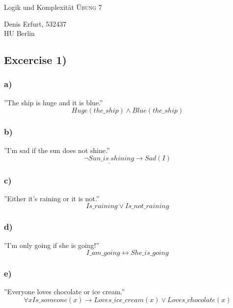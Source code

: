 \documentclass[12pt]{article}
\begin{document}
\begin{center}
\Large
Logik und Komplexität  \textsc{ Übung 7 }
\end{center}

\begin{flushright}
Denis Erfurt, 532437\\
HU Berlin \\

\vspace{2 mm}

\end{flushright}





\subsection*{Excercise 1)}
\subsubsection*{a)}
”The ship is huge and it is blue.”
\begin{equation}
  Huge(the\_ship) \land Blue(the\_ship)
\end{equation}
\subsubsection*{b)}
”I’m sad if the sun does not shine.”
\begin{equation}
  \neg Sun\_is_\_shining \rightarrow Sad(I)
\end{equation}
\subsubsection*{c)}
”Either it’s raining or it is not.”
\begin{equation}
  Is\_raining \lor Is\_not\_raining
\end{equation}
\subsubsection*{d)}
”I’m only going if she is going!”
\begin{equation}
  I\_am\_going \leftrightarrow She\_is\_going
\end{equation}
\subsubsection*{e)}
”Everyone loves chocolate or ice cream.”
\begin{equation}
  \forall x Is\_someone(x) \rightarrow  Loves\_ice\_cream(x) \lor Loves\_chocolate(x)
\end{equation}
\end{document}

